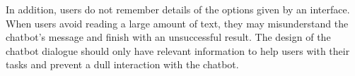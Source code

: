 \documentclass[a4paper,10pt]{article}
\begin{document}
In addition, users do not remember details of the options given by an interface. When users avoid reading a large amount of text, they may misunderstand the chatbot’s message and finish with an unsuccessful result. The design of the chatbot dialogue should only have relevant information to help users with their tasks and prevent a dull interaction with the chatbot. 

\section*{}



\section*{}

	
\medskip


\end{document}
